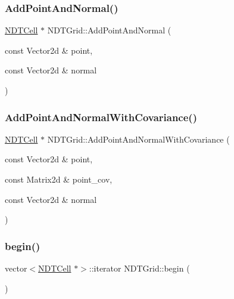\subsubsection{\texorpdfstring{Add\+Point\+And\+Normal()}{AddPointAndNormal()}}
{\footnotesize\ttfamily \hyperlink{classNDTCell}{N\+D\+T\+Cell} $\ast$ N\+D\+T\+Grid\+::\+Add\+Point\+And\+Normal (\begin{DoxyParamCaption}\item[{const Vector2d \&}]{point,  }\item[{const Vector2d \&}]{normal }\end{DoxyParamCaption})}

\mbox{\label{classNDTGrid_ae2d4baff34cfb4d86d9c0b7cdb1985ad}} 
\subsubsection{\texorpdfstring{Add\+Point\+And\+Normal\+With\+Covariance()}{AddPointAndNormalWithCovariance()}}
{\footnotesize\ttfamily \hyperlink{classNDTCell}{N\+D\+T\+Cell} $\ast$ N\+D\+T\+Grid\+::\+Add\+Point\+And\+Normal\+With\+Covariance (\begin{DoxyParamCaption}\item[{const Vector2d \&}]{point,  }\item[{const Matrix2d \&}]{point\+\_\+cov,  }\item[{const Vector2d \&}]{normal }\end{DoxyParamCaption})}

\mbox{\label{classNDTGrid_a8f7266d28b638b1da7ba4e17e52d6241}} 
\subsubsection{\texorpdfstring{begin()}{begin()}\hspace{0.1cm}{\footnotesize\ttfamily [1/2]}}
{\footnotesize\ttfamily vector$<$\hyperlink{classNDTCell}{N\+D\+T\+Cell} $\ast$$>$\+::iterator N\+D\+T\+Grid\+::begin (\begin{DoxyParamCaption}{ }\end{DoxyParamCaption})\hspace{0.3cm}{\ttfamily [inline]}}

